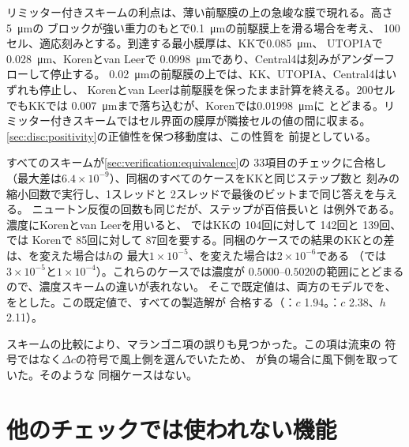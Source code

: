 リミッター付きスキームの利点は、薄い前駆膜の上の急峻な膜で現れる。高さ\SI{5}{\micro\metre}の
ブロックが強い重力のもとで\SI{0.1}{\micro\metre}の前駆膜上を滑る場合を考え、
100セル、適応刻みとする。到達する最小膜厚は、KKで\SI{0.085}{\micro\metre}、
UTOPIAで\SI{0.028}{\micro\metre}、Korenとvan Leerで
\SI{0.0998}{\micro\metre}であり、Central4は刻みがアンダーフローして停止する。
\SI{0.02}{\micro\metre}の前駆膜の上では、KK、UTOPIA、Central4はいずれも停止し、
Korenとvan Leerは前駆膜を保ったまま計算を終える。200セルでもKKでは
\SI{0.007}{\micro\metre}まで落ち込むが、Korenでは\SI{0.01998}{\micro\metre}に
とどまる。リミッター付きスキームではセル界面の膜厚が隣接セルの値の間に収まる。
\cref{sec:disc:positivity}の正値性を保つ移動度は、この性質を
前提としている。

すべてのスキームが\cref{sec:verification:equivalence}の 33項目のチェックに合格し
（最大差は$6.4\times10^{-9}$）、同梱のすべてのケースをKKと同じステップ数と
刻みの縮小回数で実行し、1スレッドと 2スレッドで最後のビットまで同じ答えを与える。
ニュートン反復の回数も同じだが、ステップが百倍長いと
は例外である。濃度にKorenとvan Leerを用いると、
ではKKの 104回に対して 142回と 139回、では
Korenで 85回に対して 87回を要する。同梱のケースでの結果のKKとの差は、を変えた場合は$h$の
最大$1\times10^{-5}$、を変えた場合は$2\times10^{-6}$である
（では$3\times10^{-5}$と$1\times10^{-4}$）。これらのケースでは濃度が
$0.5000$--$0.5020$の範囲にとどまるので、濃度スキームの違いが表れない。
そこで既定値は、両方のモデルでを、
をとした。この既定値で、すべての製造解が
合格する（：$c$ 1.94。：$c$ 2.38、$h$ 2.11）。

スキームの比較により、マランゴニ項の誤りも見つかった。この項は流束の
符号ではなく$\Delta c$の符号で風上側を選んでいたため、
が負の場合に風下側を取っていた。そのような
同梱ケースはない。

\section{他のチェックでは使われない機能}
\label{sec:verification:features}

